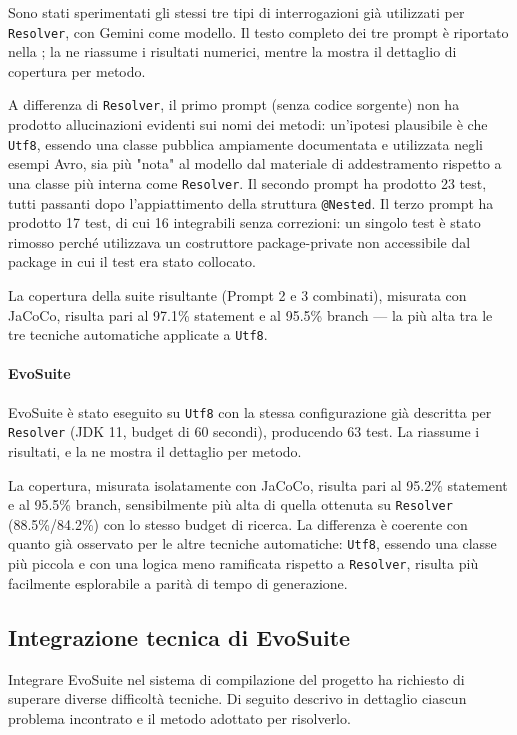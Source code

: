 Sono stati sperimentati gli stessi tre tipi di interrogazioni già
utilizzati per \texttt{Resolver}, con Gemini come modello. Il testo
completo dei tre prompt è riportato nella ; la
 ne riassume i risultati numerici, mentre
la  mostra il dettaglio di copertura per
metodo.

A differenza di \texttt{Resolver}, il primo prompt (senza codice
sorgente) non ha prodotto allucinazioni evidenti sui nomi dei metodi:
un'ipotesi plausibile è che \texttt{Utf8}, essendo una classe
pubblica ampiamente documentata e utilizzata negli esempi Avro, sia
più "nota" al modello dal materiale di addestramento rispetto a una
classe più interna come \texttt{Resolver}. Il secondo prompt ha
prodotto 23 test, tutti passanti dopo l'appiattimento della struttura
\texttt{@Nested}. Il terzo prompt ha prodotto 17 test, di cui 16
integrabili senza correzioni: un singolo test è stato rimosso perché
utilizzava un costruttore package-private non accessibile dal package
in cui il test era stato collocato.

La copertura della suite risultante (Prompt 2 e 3 combinati), misurata
con JaCoCo, risulta pari al 97.1\% statement e al 95.5\% branch — la
più alta tra le tre tecniche automatiche applicate a \texttt{Utf8}.

\paragraph{EvoSuite}

EvoSuite è stato eseguito su \texttt{Utf8} con la stessa
configurazione già descritta per \texttt{Resolver} (JDK 11, budget di
60 secondi), producendo 63 test. La 
riassume i risultati, e la  ne mostra
il dettaglio per metodo.

La copertura, misurata isolatamente con JaCoCo, risulta pari al
95.2\% statement e al 95.5\% branch, sensibilmente più alta di quella
ottenuta su \texttt{Resolver} (88.5\%/84.2\%) con lo stesso budget di
ricerca. La differenza è coerente con quanto già osservato per le
altre tecniche automatiche: \texttt{Utf8}, essendo una classe più
piccola e con una logica meno ramificata rispetto a \texttt{Resolver},
risulta più facilmente esplorabile a parità di tempo di generazione.


\subsection{Integrazione tecnica di EvoSuite}
Integrare EvoSuite nel sistema di compilazione del progetto ha richiesto 
di superare diverse difficoltà tecniche. Di seguito descrivo in 
dettaglio ciascun problema incontrato e il metodo adottato per risolverlo.

